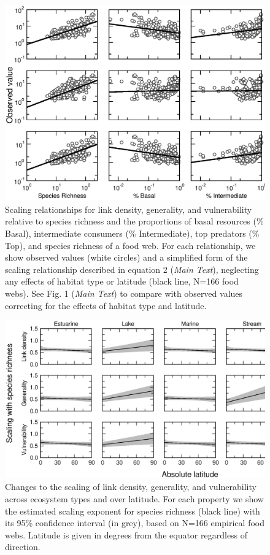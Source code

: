 \documentclass[12pt]{article}
\begin{document}
\begin{figure}[h]
\centerline{\includegraphics*[width=.75\textwidth]{Figures/by_TL/scaling_with_S/proportions/fitlines_nonts_observed.eps}}
\caption{Scaling relationships for link density, generality, 
and vulnerability relative to species richness and the proportions of basal resources (\% Basal),
intermediate consumers (\% Intermediate), top predators (\% Top), and species richness of a food web. 
For each relationship, we show observed values (white circles) and 
a simplified form of the scaling relationship described in equation 2 (\emph{Main Text}), neglecting 
any effects of habitat type or latitude (black line, N=166 food webs). See Fig. 1 (\emph{Main Text}) to compare with 
observed values correcting for the effects of habitat type and latitude. }
\label{props_v_lat_obs}
\end{figure}


\newpage


\begin{figure}[h]
\centerline{\includegraphics*[width=.8\textwidth]{Figures/by_TL/marginal/S_marginal_latitude_proportions.eps}}
\caption{Changes to the scaling of link density, generality, and vulnerability across ecosystem
types and over latitude. For each property we show the estimated scaling exponent for species richness (black
line) with its 95\% confidence interval (in grey),
based on N=166 empirical food webs. Latitude is 
given in degrees from the equator
regardless of direction.}
\label{S}
\end{figure}
\end{document}
